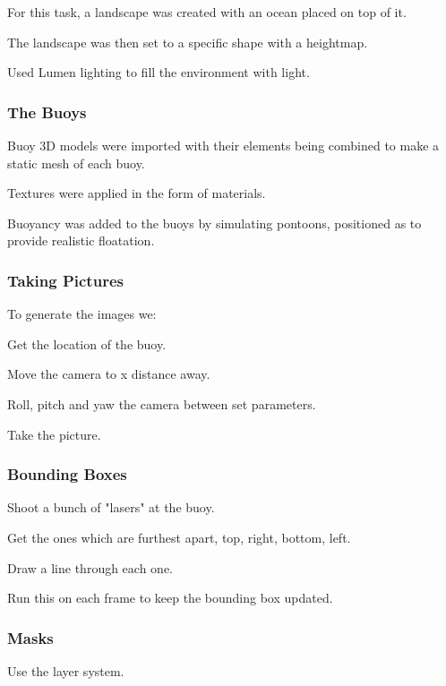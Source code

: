 \documentclass{article}
\begin{document}
For this task, a landscape was created with an ocean placed on top of it. 

The landscape was then set to a specific shape with a heightmap.

Used Lumen lighting to fill the environment with light.

\subsubsection{The Buoys}

Buoy 3D models were imported with their elements being combined to make a static mesh of each buoy.

Textures were applied in the form of materials.

Buoyancy was added to the buoys by simulating pontoons, positioned as to provide realistic floatation.


\subsubsection{Taking Pictures}

To generate the images we:

Get the location of the buoy. 

Move the camera to x distance away. 

Roll, pitch and yaw the camera between set parameters. 

Take the picture.

\subsubsection{Bounding Boxes}

Shoot a bunch of "lasers" at the buoy.

Get the ones which are furthest apart, top, right, bottom, left.

Draw a line through each one. 

Run this on each frame to keep the bounding box updated.

\subsubsection{Masks}

Use the layer system. 
\end{document}
